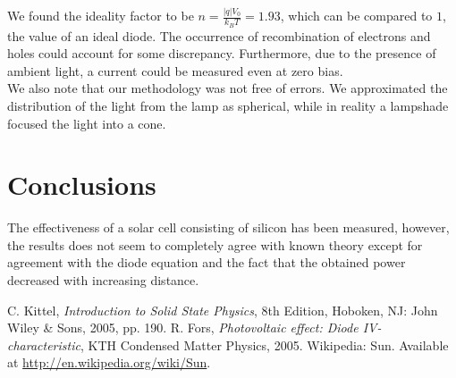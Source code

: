 \documentclass[12pt,a4paper]{article}
\begin{document}
We found the ideality factor to be $n = \frac{|q|V_0}{k_BT} = 1.93$, which can be compared to $1$, the value of an ideal diode. The occurrence of recombination of electrons and holes could account for some discrepancy. Furthermore, due to the presence of ambient light, a current could be measured even at zero bias. \\

We also note that our methodology was not free of errors. We approximated the distribution of the light from the lamp as spherical, while in reality a lampshade focused the light into a cone.

\section{Conclusions}
The effectiveness of a solar cell consisting of silicon has been measured, however, the results does not seem to completely agree with known theory except for agreement with the diode equation and the fact that the obtained power decreased with increasing distance.


\begin{thebibliography}{9}
 C. Kittel, \emph{Introduction to Solid State Physics}, 8th Edition, Hoboken, NJ: John Wiley \& Sons, 2005, pp. 190.
 R. Fors, \emph{Photovoltaic effect: Diode IV-characteristic}, KTH Condensed Matter Physics, 2005.
 Wikipedia: Sun. Available at \url{http://en.wikipedia.org/wiki/Sun}.
\end{thebibliography}
\end{document}
